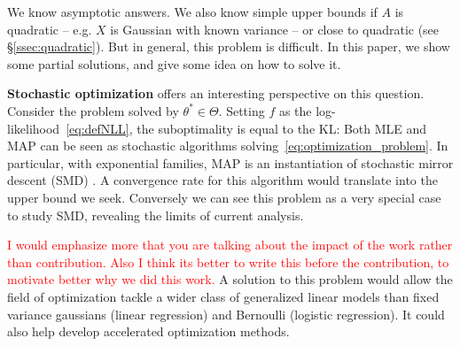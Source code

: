 \documentclass[twoside]{article}
\newcommand{\logpart}{A}
\newcommand{\nat}{\theta}
\begin{document}
We know asymptotic answers.
We also know simple upper bounds if $\logpart$ is quadratic -- e.g. $X$ is Gaussian with known variance --
or close to quadratic (see \S\ref{ssec:quadratic}).
But in general, this problem is difficult. In this paper, we show some partial solutions, and give some idea on how to solve it.


{\bf Stochastic optimization} offers an interesting perspective on this question.
Consider the problem
solved by $\nat^*\in \Theta$.
Setting $f$ as the log-likelihood~\eqref{eq:defNLL}, the suboptimality is equal to the KL:
\alignn{
	f(\nat) - f(\nat^*) = \KL\paren{p_{\nat^*} || p_{\nat} }
	\label{eq:suboptimalityKL}
}
Both MLE and MAP can be seen as stochastic algorithms solving~\eqref{eq:optimization_problem}.
In particular, with exponential families, MAP is an instantiation of stochastic mirror descent (SMD) \citep{nemirovski2009robust}.
A convergence rate for this algorithm would translate into the upper bound we seek.
Conversely we can see this problem as a very special case to study SMD, revealing the limits of current analysis.

\textcolor{red}{I would emphasize more that you are talking about the impact of the work rather than contribution. Also I think its better to write this before the contribution, to motivate better why we did this work. }A solution to this problem would allow the field of optimization tackle a wider class of generalized linear models than fixed variance gaussians (linear regression) and Bernoulli (logistic regression).
It could also help develop accelerated optimization methods.
\end{document}
